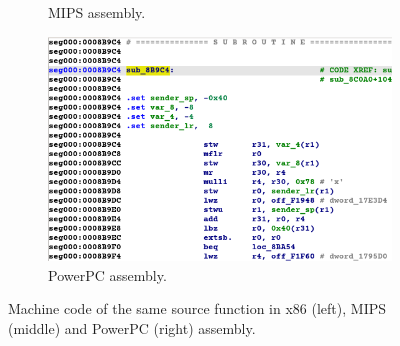 \begin{frame}
\begin{figure}[htbp]
\begin{subfigure}[t]{0.32\textwidth}
			\caption{MIPS assembly.}
		\end{subfigure}
		\hfill
		\begin{subfigure}[t]{0.32\textwidth}
			\centering
			\includegraphics[width=\linewidth,valign=t]{inc/example/ppc_zoom.png}
			\caption{PowerPC assembly.}
		\end{subfigure}
		\caption{Machine code of the same source function in x86 (left), MIPS (middle) and PowerPC (right) assembly.}
	\end{figure}

\end{frame}

